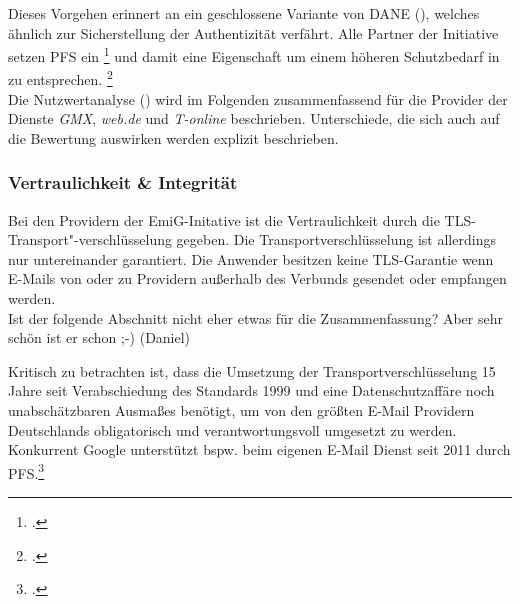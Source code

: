 \documentclass  [paper=a4,
				fontsize=12pt,
				listof=totoc,
				bibliography=totoc
				]{scrreprt}
\begin{document}
			Dieses Vorgehen erinnert an ein geschlossene Variante von \ac{DANE} (), welches ähnlich zur Sicherstellung der Authentizität verfährt.
			Alle Partner der Initiative setzen \ac{PFS} ein
			\footcite[Vgl.][]{Zivadino14-1}
			und damit eine Eigenschaft um einem höheren Schutzbedarf in zu entsprechen.
			\footcite[Vgl.][]{Zivadino14-2} 
			\medskip\\
			Die Nutzwertanalyse () wird im Folgenden zusammenfassend für die Provider der Dienste \textit{GMX}, \textit{web.de} und \textit{T-online} beschrieben. 
			Unterschiede, die sich auch auf die Bewertung auswirken werden explizit beschrieben.
			\pagebreak
		\subsubsection{Vertraulichkeit & Integrität}		
			Bei den Providern der EmiG-Initative ist die Vertraulichkeit durch die TLS-Transport"-verschlüsselung gegeben. 
			Die Transportverschlüsselung ist allerdings nur untereinander garantiert. 
			Die Anwender besitzen keine TLS-Garantie wenn E-Mails von oder zu Providern außerhalb des Verbunds gesendet oder empfangen werden.\\

			\color{darkred}
				Ist der folgende Abschnitt nicht eher etwas für die Zusammenfassung?
				Aber sehr schön ist er schon ;-) (Daniel)
			\color{black}

			Kritisch zu betrachten ist, dass die Umsetzung der Transportverschlüsselung 15 Jahre seit Verabschiedung des Standards 1999 und eine Datenschutzaffäre noch unabschätzbaren Ausmaßes benötigt, um von den größten E-Mail Providern Deutschlands obligatorisch und verantwortungsvoll umgesetzt zu werden. 
			Konkurrent Google unterstützt bspw. beim eigenen E-Mail Dienst seit 2011 durch PFS.\footcite[Vgl.][]{Boeck2013}
			
\end{document}
